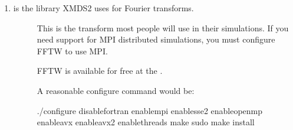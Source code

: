 \documentclass[letterpaper,10pt,english]{sphinxmanual}
\begin{document}
\begin{enumerate}
\begin{description}
\begin{enumerate}
\begin{description}
\sphinxAtStartPar
XMDS2 only requires the single process version of HDF5, so there is no need to install the MPI version.

\sphinxAtStartPar
* Sidebar: Installing HDF5 from source follows a common pattern, which you may find yourself repeating later:
\begin{enumerate}
%
\item {} 
\sphinxAtStartPar
After extracting the source directory, type  and then add possible options.
\begin{quote}

\sphinxAtStartPar
(For HDF5, install with the  option if you want XMDS2 to find the library automatically.  This is rarely needed for other packages.)
\end{quote}

\item {} 
\sphinxAtStartPar
Once that is finished, type .  Then wait for that to finish, which will often be longer than you think.

\item {} 
\sphinxAtStartPar
Finally, type  to install it into the appropriate directory.

\end{enumerate}

\end{description}

\item {} \begin{description}
\item[{ is the library XMDS2 uses for Fourier transforms.}] \leavevmode
\sphinxAtStartPar
This is the transform most people will use in their simulations. If you need
support for MPI distributed simulations, you must configure FFTW to use MPI.

\sphinxAtStartPar
FFTW is available for free at the .

\sphinxAtStartPar
A reasonable configure command would be:

\begin{sphinxVerbatim}[commandchars=\\\{\}]
./configure \PYGZhy{}\PYGZhy{}disable\PYGZhy{}fortran \PYGZhy{}\PYGZhy{}enable\PYGZhy{}mpi \PYGZhy{}\PYGZhy{}enable\PYGZhy{}sse2 \PYGZhy{}\PYGZhy{}enable\PYGZhy{}openmp \PYGZhy{}\PYGZhy{}enable\PYGZhy{}avx \PYGZhy{}\PYGZhy{}enable\PYGZhy{}avx2 \PYGZhy{}\PYGZhy{}enable\PYGZhy{}threads
make
sudo make install
\end{sphinxVerbatim}


\end{description}
\end{enumerate}
\end{description}
\end{enumerate}
\end{document}
